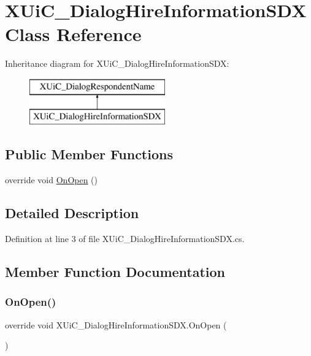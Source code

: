 \hypertarget{class_x_ui_c___dialog_hire_information_s_d_x}{}\section{X\+Ui\+C\+\_\+\+Dialog\+Hire\+Information\+S\+DX Class Reference}
\label{class_x_ui_c___dialog_hire_information_s_d_x}
Inheritance diagram for X\+Ui\+C\+\_\+\+Dialog\+Hire\+Information\+S\+DX\+:\begin{figure}[H]
\begin{center}
\leavevmode
\includegraphics[height=2.000000cm]{df/d79/class_x_ui_c___dialog_hire_information_s_d_x}
\end{center}
\end{figure}
\subsection*{Public Member Functions}
\begin{DoxyCompactItemize}
\item 
override void \mbox{\hyperlink{class_x_ui_c___dialog_hire_information_s_d_x_a114f430d83194ae17da0e36c620f3d98}{On\+Open}} ()
\end{DoxyCompactItemize}


\subsection{Detailed Description}


Definition at line 3 of file X\+Ui\+C\+\_\+\+Dialog\+Hire\+Information\+S\+D\+X.\+cs.



\subsection{Member Function Documentation}
\mbox{\label{class_x_ui_c___dialog_hire_information_s_d_x_a114f430d83194ae17da0e36c620f3d98}} 
\subsubsection{\texorpdfstring{OnOpen()}{OnOpen()}}
{\footnotesize\ttfamily override void X\+Ui\+C\+\_\+\+Dialog\+Hire\+Information\+S\+D\+X.\+On\+Open (\begin{DoxyParamCaption}{ }\end{DoxyParamCaption})}




